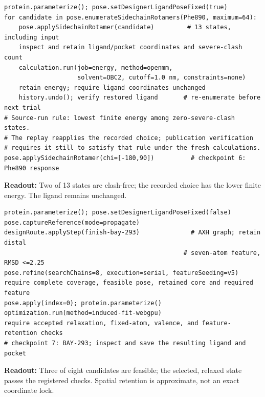\documentclass[11pt]{article}
\begin{document}
\begin{small}
\begin{minipage}{\linewidth}
\begin{lstlisting}[style=sosreadable]
protein.parameterize(); pose.setDesignerLigandPoseFixed(true)
for candidate in pose.enumerateSidechainRotamers(Phe890, maximum=64):
    pose.applySidechainRotamer(candidate)         # 13 states, including input
    inspect and retain ligand/pocket coordinates and severe-clash count
    calculation.run(job=energy, method=openmm,
                    solvent=OBC2, cutoff=1.0 nm, constraints=none)
    retain energy; require ligand coordinates unchanged
    history.undo(); verify restored ligand       # re-enumerate before next trial
# Source-run rule: lowest finite energy among zero-severe-clash states.
# The replay reapplies the recorded choice; publication verification
# requires it still to satisfy that rule under the fresh calculations.
pose.applySidechainRotamer(chi=[-180,90])          # checkpoint 6: Phe890 response
\end{lstlisting}
{\small\textcolor{sosresponse}{\textbf{Readout:}} Two of 13 states are clash-free; the recorded choice has the lower finite energy. The ligand remains unchanged.}
\end{minipage}

\begin{minipage}{\linewidth}
\begin{lstlisting}[style=sosreadable]
protein.parameterize(); pose.setDesignerLigandPoseFixed(false)
pose.captureReference(mode=propagate)
designRoute.applyStep(finish-bay-293)              # AXH graph; retain distal
                                                 # seven-atom feature, RMSD <=2.25
pose.refine(searchChains=8, execution=serial, featureSeeding=v5)
require complete coverage, feasible pose, retained core and required feature
pose.apply(index=0); protein.parameterize()
optimization.run(method=induced-fit-webgpu)
require accepted relaxation, fixed-atom, valence, and feature-retention checks
# checkpoint 7: BAY-293; inspect and save the resulting ligand and pocket
\end{lstlisting}
{\small\textcolor{sosedit}{\textbf{Readout:}} Three of eight candidates are feasible; the selected, relaxed state passes the registered checks. Spatial retention is approximate, not an exact coordinate lock.}
\end{minipage}


\end{small}
\end{document}
